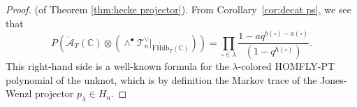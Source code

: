 \documentclass[12pt]{amsart}
\numberwithin{equation}{section}
\newtheorem{theorem}{Theorem}[section]
\theoremstyle{definition}
\theoremstyle{remark}
\DeclareMathOperator{\Hom}{Hom}
\newcommand{\CC}{\mathbb{C}}
\newcommand{\CA}{\mathcal{A}}
\newcommand{\CP}{\mathcal{P}}
\newcommand{\CT}{\mathcal{T}}
\renewcommand{\1}{\mathbf{1}}
\newcommand{\FH}{\mathrm{FHilb}}
\newcommand{\oFH}{\mathring{\FH}}
\newcommand{\oCA}{\mathring{\CA}}
\begin{document}
\begin{proof} (of Theorem \ref{thm:hecke projector}). 
From Corollary~\ref{cor:decat ps}, we see that 
$$P\left(\oCA_T(\CC) \otimes \left( \wedge^{\bullet}\CT_n^{\vee}|_{\oFH_T(\CC)} \right) \right)= 
\prod_{\square\in \lambda}\frac{1-aq^{b(\square)-a(\square)}}{(1-q^{h(\square)})}.$$
This right-hand side is a well-known formula for the \(\lambda\)-colored HOMFLY-PT polynomial of the unknot, which is by definition the Markov trace of the Jones-Wenzl projector \(p_\lambda \in H_n\). 

\end{proof}






\end{document}
